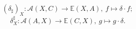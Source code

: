 \documentclass[preview]{standalone}
\begin{document}
\begin{center}
$$(\delta_\sharp)_X: \mathscr{A}(X,C) \to \mathbb{E}(X,A), \ f\mapsto \delta\cdot f;$$$$\delta_X^\sharp:\mathscr{A}(A,X) \to \mathbb{E}(C,X), \ g\mapsto g\cdot\delta.$$
\end{center}
\end{document}
